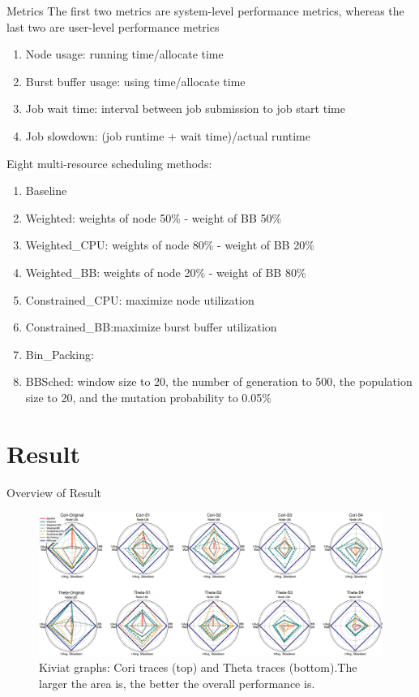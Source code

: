 \documentclass[aspectratio=1610]{beamer}
\begin{document}
\begin{frame}{Metrics}
The first two metrics are system-level performance metrics, whereas the last two are user-level performance metrics
\begin{enumerate}
    \item Node usage: running time/allocate time
    \item Burst buffer usage: using time/allocate time
    \item Job wait time: interval between job submission to job start time
    \item Job slowdown: (job runtime + wait time)/actual runtime
\end{enumerate}
Eight multi-resource scheduling methods:
\begin{enumerate}
    \item Baseline
    \item Weighted: weights of node 50\% - weight of BB 50\%
    \item Weighted\_CPU: weights of node 80\% - weight of BB 20\%
    \item Weighted\_BB:  weights of node 20\% - weight of BB 80\%
    \item Constrained\_CPU: maximize node utilization
    \item Constrained\_BB:maximize burst buffer utilization 
    \item Bin\_Packing:
    \item BBSched: window size to 20, the number of generation to 500, the population size to 20, and the mutation probability to 0.05\%
\end{enumerate}
\end{frame}

\section{Result}

\begin{frame}{Overview of Result}
    \begin{figure}
        \centering
        \includegraphics[scale=0.247]{pic/overall_performence.png}
        \caption{Kiviat graphs: Cori traces (top) and Theta traces (bottom).The
            larger the area is, the better the overall performance is.}
        \label{fig:my_label}
    \end{figure}
\end{frame}
\end{document}
